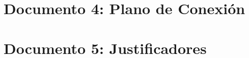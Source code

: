 \documentclass[]{article}
\begin{document}
\newpage

\section{Documento 4: Plano de Conexión}

\newpage

\section{Documento 5: Justificadores}





% 
\end{document}
